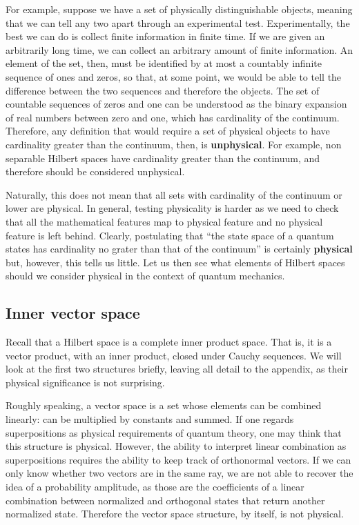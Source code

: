 \documentclass[10pt,twocolumn, nofootinbib]{revtex4-2}
\begin{document}
For example, suppose we have a set of physically distinguishable objects, meaning that we can tell any two apart through an experimental test. Experimentally, the best we can do is collect finite information in finite time. If we are given an arbitrarily long time, we can collect an arbitrary amount of finite information. An element of the set, then, must be identified by at most a countably infinite sequence of ones and zeros, so that, at some point, we would be able to tell the difference between the two sequences and therefore the objects. The set of countable sequences of zeros and one can be understood as the binary expansion of real numbers between zero and one, which has cardinality of the continuum. Therefore, any definition that would require a set of physical objects to have cardinality greater than the continuum, then, is \textbf{unphysical}. For example, non separable Hilbert spaces have cardinality greater than the continuum, and therefore should be considered unphysical.

Naturally, this does not mean that all sets with cardinality of the continuum or lower are physical. In general, testing physicality is harder as we need to check that all the mathematical features map to physical feature and no physical feature is left behind. Clearly, postulating that ``the state space of a quantum states has cardinality no grater than that of the continuum'' is certainly \textbf{physical} but, however, this tells us little. Let us then see what elements of Hilbert spaces should we consider physical in the context of quantum mechanics.

\subsection{Inner vector space}

Recall that a Hilbert space is a complete inner product space. That is, it is a vector product, with an inner product, closed under Cauchy sequences. We will look at the first two structures briefly, leaving all detail to the appendix, as their physical significance is not surprising.

Roughly speaking, a vector space is a set whose elements can be combined linearly: can be multiplied by constants and summed. If one regards superpositions as physical requirements of quantum theory, one may think that this structure is physical. However, the ability to interpret linear combination as superpositions requires the ability to keep track of orthonormal vectors. If we can only know whether two vectors are in the same ray, we are not able to recover the idea of a probability amplitude, as those are the coefficients of a linear combination between normalized and orthogonal states that return another normalized state. Therefore the vector space structure, by itself, is not physical.
\end{document}
